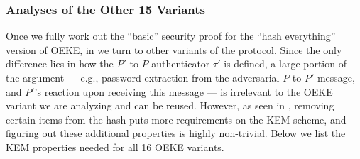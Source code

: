 \documentclass{article}
\theoremstyle{plain}
\theoremstyle{definition}
\theoremstyle{remark}
\begin{document}
\subsubsection{Analyses of the Other 15 Variants}
Once we fully work out the ``basic'' security proof for the ``hash everything'' version of OEKE, in  we turn to other variants of the protocol. Since the only difference lies in how the $P'$-to-$P$ authenticator $\tau'$ is defined, a large portion of the argument --- e.g., password extraction from the adversarial $P$-to-$P'$ message, and $P'$'s reaction upon receiving this message --- is irrelevant to the OEKE variant we are analyzing and can be reused. However, as seen in , removing certain items from the hash puts more requirements on the KEM scheme, and figuring out these additional properties is highly non-trivial. Below we list the KEM properties needed for all 16 OEKE variants.
\end{document}
